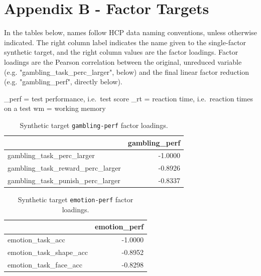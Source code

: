 \documentclass{article}
\begin{document}
\section{Appendix B - Factor Targets} \label{sec:appendix-b}


%



In the tables below, names follow HCP data naming conventions, unless otherwise
indicated. The right column label indicates the name given to the single-factor
synthetic target, and the right column values are the factor loadings. Factor
loadings are the Pearson correlation between the original, unreduced variable
(e.g. "gambling\_task\_perc\_larger", below) and the final linear factor reduction
(e.g. "gambling\_perf", directly below).

\_perf = test performance, i.e.\ test score
\_rt = reaction time, i.e.\ reaction times on a test
wm = working memory

\begin{table}[H]
\centering
\begin{tabular}{lr}
\toprule
 & gambling\_perf \\
\midrule
gambling\_task\_perc\_larger & -1.0000 \\
gambling\_task\_reward\_perc\_larger & -0.8926 \\
gambling\_task\_punish\_perc\_larger & -0.8337 \\
\bottomrule
\end{tabular}

\footnotesize
\caption{Synthetic target \texttt{gambling-perf} factor loadings.}\label{tab:gambling-perf}
\normalsize
\end{table}


\begin{table}[H]
\centering
\begin{tabular}{lr}
\toprule
 & emotion\_perf \\
\midrule
emotion\_task\_acc & -1.0000 \\
emotion\_task\_shape\_acc & -0.8952 \\
emotion\_task\_face\_acc & -0.8298 \\
\bottomrule
\end{tabular}

\footnotesize
\caption{Synthetic target \texttt{emotion-perf} factor loadings.}
\normalsize
\label{tab:emotion-perf}
\end{table}
\end{document}
